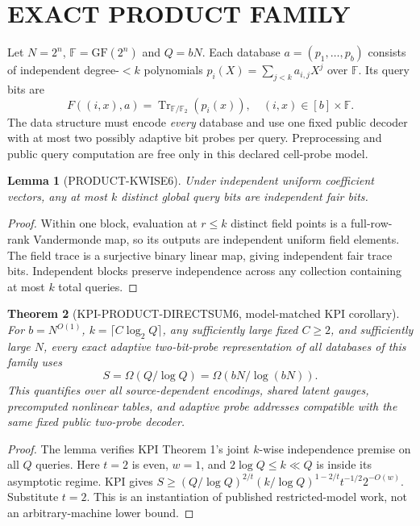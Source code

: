 \documentclass[11pt]{article}
\newtheorem{theorem}{Theorem}
\newtheorem{lemma}[theorem]{Lemma}
\begin{document}
\section{EXACT PRODUCT FAMILY}
Let $N=2^n$, $\mathbb F=\mathrm{GF}(2^n)$ and $Q=bN$. Each database $a=(p_1,\ldots,p_b)$ consists of independent degree-$<k$ polynomials $p_i(X)=\sum_{j<k}a_{i,j}X^j$ over $\mathbb F$. Its query bits are
\[
F((i,x),a)=\operatorname{Tr}_{\mathbb F/\mathbb F_2}(p_i(x)),\quad(i,x)\in[b]\times\mathbb F.
\]
The data structure must encode \emph{every} database and use one fixed public decoder with at most two possibly adaptive bit probes per query. Preprocessing and public query computation are free only in this declared cell-probe model.

\begin{lemma}[PRODUCT-KWISE6]
Under independent uniform coefficient vectors, any at most $k$ distinct global query bits are independent fair bits.
\end{lemma}
\begin{proof}
Within one block, evaluation at $r\le k$ distinct field points is a full-row-rank Vandermonde map, so its outputs are independent uniform field elements. The field trace is a surjective binary linear map, giving independent fair trace bits. Independent blocks preserve independence across any collection containing at most $k$ total queries.
\end{proof}

\begin{theorem}[KPI-PRODUCT-DIRECTSUM6, model-matched KPI corollary]
For $b=N^{O(1)}$, $k=\lceil C\log_2Q\rceil$, any sufficiently large fixed $C\ge2$, and sufficiently large $N$, every exact adaptive two-bit-probe representation of \emph{all} databases of this family uses
\[
\boxed{S=\Omega(Q/\log Q)=\Omega(bN/\log(bN)).}
\]
This quantifies over all source-dependent encodings, shared latent gauges, precomputed nonlinear tables, and adaptive probe addresses compatible with the same fixed public two-probe decoder.
\end{theorem}
\begin{proof}
The lemma verifies KPI Theorem 1's joint $k$-wise independence premise on all $Q$ queries. Here $t=2$ is even, $w=1$, and $2\log Q\le k\ll Q$ is inside its asymptotic regime. KPI gives $S\ge(Q/\log Q)^{2/t}(k/\log Q)^{1-2/t}t^{-1/2}2^{-O(w)}$. Substitute $t=2$. This is an instantiation of published restricted-model work, not an arbitrary-machine lower bound.
\end{proof}
\end{document}
